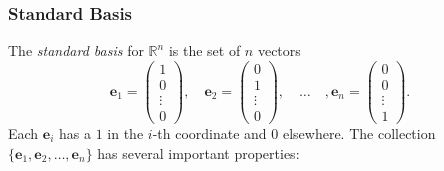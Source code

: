 \subsubsection{Standard Basis}
\noindent
The \emph{standard basis} for $\mathbb{R}^n$ is the set of $n$ vectors 
\[
\mathbf{e}_1 = 
\begin{pmatrix}
1 \\
0 \\
\vdots \\
0
\end{pmatrix}, \quad
\mathbf{e}_2 = 
\begin{pmatrix}
0 \\
1 \\
\vdots \\
0
\end{pmatrix}, 
\quad \dots \quad,
\mathbf{e}_n = 
\begin{pmatrix}
0 \\
0 \\
\vdots \\
1
\end{pmatrix}.
\]
Each $\mathbf{e}_i$ has a $1$ in the $i$-th coordinate and $0$ elsewhere. The collection 
$\{\mathbf{e}_1,\mathbf{e}_2,\dots,\mathbf{e}_n\}$ has several important properties:

